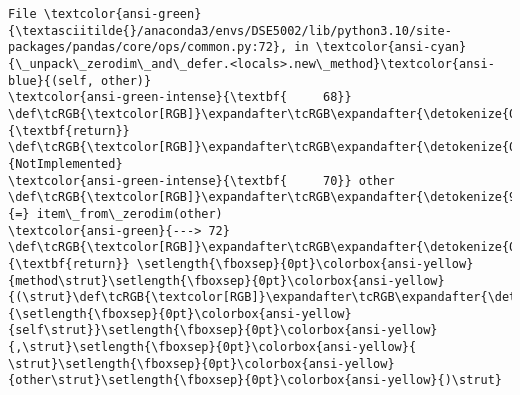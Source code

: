 \documentclass[11pt]{article}
\begin{document}
\begin{Verbatim}[commandchars=\\\{\}, frame=single, framerule=2mm, rulecolor=\color{outerrorbackground}]
File \textcolor{ansi-green}{\textasciitilde{}/anaconda3/envs/DSE5002/lib/python3.10/site-packages/pandas/core/ops/common.py:72}, in \textcolor{ansi-cyan}{\_unpack\_zerodim\_and\_defer.<locals>.new\_method}\textcolor{ansi-blue}{(self, other)}
\textcolor{ansi-green-intense}{\textbf{     68}}             \def\tcRGB{\textcolor[RGB]}\expandafter\tcRGB\expandafter{\detokenize{0,135,0}}{\textbf{return}} \def\tcRGB{\textcolor[RGB]}\expandafter\tcRGB\expandafter{\detokenize{0,135,0}}{NotImplemented}
\textcolor{ansi-green-intense}{\textbf{     70}} other \def\tcRGB{\textcolor[RGB]}\expandafter\tcRGB\expandafter{\detokenize{98,98,98}}{=} item\_from\_zerodim(other)
\textcolor{ansi-green}{---> 72} \def\tcRGB{\textcolor[RGB]}\expandafter\tcRGB\expandafter{\detokenize{0,135,0}}{\textbf{return}} \setlength{\fboxsep}{0pt}\colorbox{ansi-yellow}{method\strut}\setlength{\fboxsep}{0pt}\colorbox{ansi-yellow}{(\strut}\def\tcRGB{\textcolor[RGB]}\expandafter\tcRGB\expandafter{\detokenize{0,135,0}}{\setlength{\fboxsep}{0pt}\colorbox{ansi-yellow}{self\strut}}\setlength{\fboxsep}{0pt}\colorbox{ansi-yellow}{,\strut}\setlength{\fboxsep}{0pt}\colorbox{ansi-yellow}{ \strut}\setlength{\fboxsep}{0pt}\colorbox{ansi-yellow}{other\strut}\setlength{\fboxsep}{0pt}\colorbox{ansi-yellow}{)\strut}


\end{Verbatim}
\end{document}
